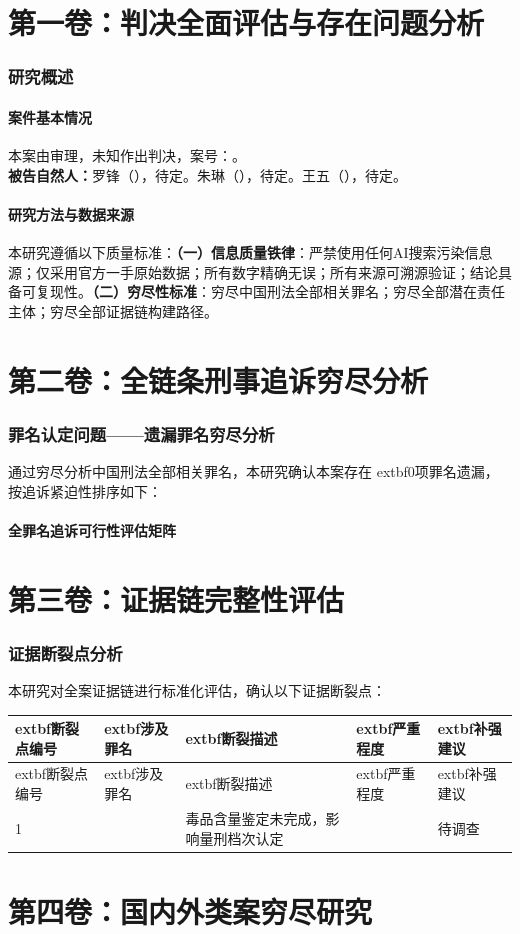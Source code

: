 \documentclass[11pt,a4paper,oneside]{article}
\begin{document}
\part{第一卷：判决全面评估与存在问题分析}\section{研究概述}\subsection{案件基本情况}本案由审理，未知作出判决，案号：。\\\textbf{被告自然人：}罗锋（），待定。朱琳（），待定。王五（），待定。\subsection{研究方法与数据来源}
本研究遵循以下质量标准：\textbf{（一）信息质量铁律}：严禁使用任何AI搜索污染信息源；仅采用官方一手原始数据；所有数字精确无误；所有来源可溯源验证；结论具备可复现性。\textbf{（二）穷尽性标准}：穷尽中国刑法全部相关罪名；穷尽全部潜在责任主体；穷尽全部证据链构建路径。\part{第二卷：全链条刑事追诉穷尽分析}
\section{罪名认定问题——遗漏罪名穷尽分析}通过穷尽分析中国刑法全部相关罪名，本研究确认本案存在	extbf{0项罪名遗漏}，按追诉紧迫性排序如下：\subsection{全罪名追诉可行性评估矩阵}\part{第三卷：证据链完整性评估}
\section{证据断裂点分析}
本研究对全案证据链进行标准化评估，确认以下证据断裂点：\begin{longtable}{|p{2cm}|p{2.5cm}|p{4cm}|p{2cm}|p{3.5cm}|}
\toprule
	extbf{断裂点编号} & 	extbf{涉及罪名} & 	extbf{断裂描述} & 	extbf{严重程度} & 	extbf{补强建议} \\
\midrule
\endfirsthead
	extbf{断裂点编号} & 	extbf{涉及罪名} & 	extbf{断裂描述} & 	extbf{严重程度} & 	extbf{补强建议} \\
\midrule
\endhead
1 &  & 毒品含量鉴定未完成，影响量刑档次认定 &  & 待调查 \
\midrule
\bottomrule
\end{longtable}\part{第四卷：国内外类案穷尽研究}
\end{document}
